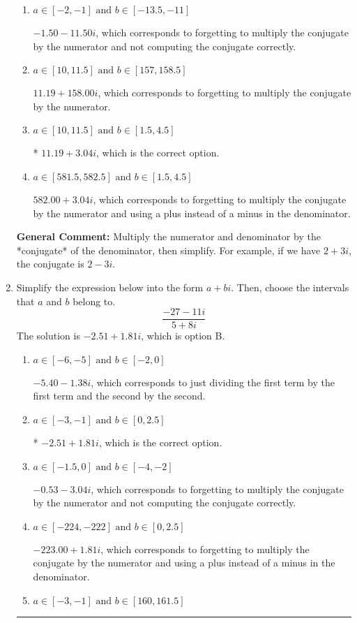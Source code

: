 \documentclass{extbook}[14pt]
\newcommand{\litem}[1]{\item #1

\rule{\textwidth}{0.4pt}}
\begin{document}
\begin{enumerate}
{\begin{enumerate}[label=\Alph*.]
 $15.75  + 9.17 i$, which corresponds to just dividing the first term by the first term and the second by the second.
\item \( a \in [-2, -1] \text{ and } b \in [-13.5, -11] \)

 $-1.50  - 11.50 i$, which corresponds to forgetting to multiply the conjugate by the numerator and not computing the conjugate correctly.
\item \( a \in [10, 11.5] \text{ and } b \in [157, 158.5] \)

 $11.19  + 158.00 i$, which corresponds to forgetting to multiply the conjugate by the numerator.
\item \( a \in [10, 11.5] \text{ and } b \in [1.5, 4.5] \)

* $11.19  + 3.04 i$, which is the correct option.
\item \( a \in [581.5, 582.5] \text{ and } b \in [1.5, 4.5] \)

 $582.00  + 3.04 i$, which corresponds to forgetting to multiply the conjugate by the numerator and using a plus instead of a minus in the denominator.
\end{enumerate}

\textbf{General Comment:} Multiply the numerator and denominator by the *conjugate* of the denominator, then simplify. For example, if we have $2+3i$, the conjugate is $2-3i$.
}
\litem{
Simplify the expression below into the form $a+bi$. Then, choose the intervals that $a$ and $b$ belong to.
\[ \frac{-27 - 11 i}{5 + 8 i} \]The solution is \( -2.51  + 1.81 i \), which is option B.\begin{enumerate}[label=\Alph*.]
\item \( a \in [-6, -5] \text{ and } b \in [-2, 0] \)

 $-5.40  - 1.38 i$, which corresponds to just dividing the first term by the first term and the second by the second.
\item \( a \in [-3, -1] \text{ and } b \in [0, 2.5] \)

* $-2.51  + 1.81 i$, which is the correct option.
\item \( a \in [-1.5, 0] \text{ and } b \in [-4, -2] \)

 $-0.53  - 3.04 i$, which corresponds to forgetting to multiply the conjugate by the numerator and not computing the conjugate correctly.
\item \( a \in [-224, -222] \text{ and } b \in [0, 2.5] \)

 $-223.00  + 1.81 i$, which corresponds to forgetting to multiply the conjugate by the numerator and using a plus instead of a minus in the denominator.
\item \( a \in [-3, -1] \text{ and } b \in [160, 161.5] \)


\end{enumerate}}
\end{enumerate}
\end{document}
